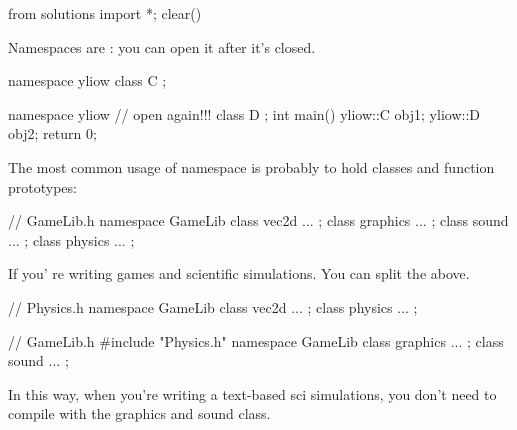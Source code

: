 \begin{python0}
from solutions import *; clear()
\end{python0}

Namespaces are : you can open it after it's closed.
\begin{console}
namespace yliow
{    
     class C
     {};
}

namespace yliow // open again!!!
{    
     class D
     {};
}
int main()
{   
     yliow::C obj1;
     yliow::D obj2;
     return 0;
}
 
\end{console}

The most common usage of namespace is probably to hold classes and function prototypes:

\begin{console}
// GameLib.h
namespace GameLib
{    
     class vec2d { ... };
     class graphics { ... };
     class sound { ... }; 
     class physics { ... };
}
               
\end{console}

If you' re writing games and scientific simulations. You
can split the above.

\begin{console}
// Physics.h
namespace GameLib
{    
     class vec2d { ... };
     class physics { ... };
} 
\end{console}

\begin{console}
// GameLib.h
#include "Physics.h"
namespace GameLib
{    
     class graphics { ... };
     class sound { ... };
} 
\end{console}

In this way, when you're writing a text-based sci simulations, you don't need to compile with the graphics and sound class.

